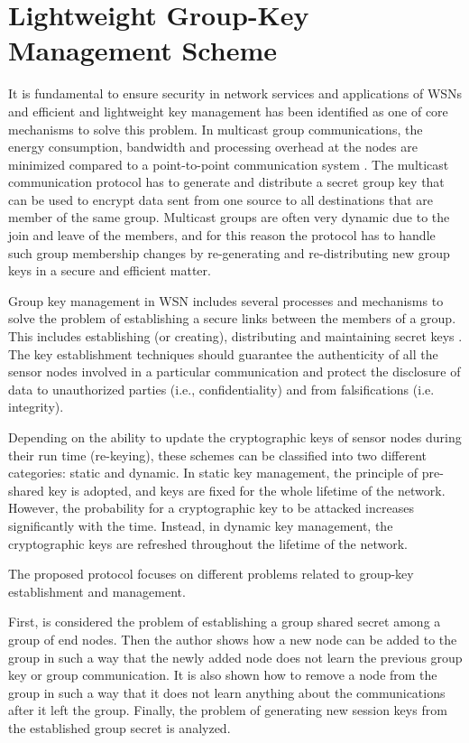 \chapter{Lightweight Group-Key Management Scheme}
\label{ch:lightwightProto}
It is fundamental to ensure security in network services and applications of WSNs and efficient and lightweight key management has been identified as one of core mechanisms to solve this problem.
In multicast group communications, the energy consumption, bandwidth and processing overhead at the nodes are minimized compared to a point-to-point communication system \cite{Rahman2015}. 
The multicast communication protocol has to generate and distribute a secret group key that can be used to encrypt data sent from one source to all destinations that are member of the same group. 
Multicast groups are often very dynamic due to the join and leave of the members, and for this reason the protocol has to handle such group membership changes by re-generating and re-distributing new group keys in a secure and efficient matter. 

Group key management in WSN includes several processes and mechanisms to solve the problem of  establishing a secure links between the members of a group.
This includes establishing (or creating), distributing and maintaining secret keys \cite{He2013JournalSurvey}.
The key establishment techniques should guarantee the authenticity of all the sensor nodes involved in a particular communication and protect the disclosure of data to unauthorized parties (i.e., confidentiality) and from falsifications (i.e. integrity).

Depending on the ability to update the cryptographic keys of sensor nodes during their run time (re-keying), these schemes can be classified into two different categories: static and dynamic.  
In static key management, the principle of pre-shared key is adopted, and keys are fixed for the whole lifetime  of  the  network.  
However, the probability for a cryptographic key to be attacked increases significantly with the time.  
Instead, in dynamic key management, the cryptographic keys are refreshed  throughout the lifetime of the network.

The proposed protocol focuses on different problems related to group-key establishment and management.

First, is considered the problem of establishing a group shared secret among a group of end nodes. 
Then the author shows how a new node can be added to the group in such a way that the newly added node does not learn the previous group key or group communication. 
It is also shown how to remove a node from the group in such a way that it does not learn anything about the communications after it left the group. 
Finally, the problem of generating new session keys from the established group secret is analyzed.  

